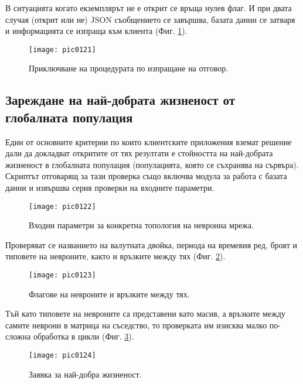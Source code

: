 В ситуацията когато екземплярът не е открит се връща нулев флаг. И при двата случая (открит или не) JSON съобщението се завършва, базата данни се затваря и информацията се изпраща към клиента (Фиг. \ref{fig:pic0121}).

\begin{figure}[h]
  \centering
  \texttt{[image: pic0121]}
  \caption{Приключване на процедурата по изпращане на отговор.}
\label{fig:pic0121}
\end{figure}
\FloatBarrier

\subsection{Зареждане на най-добрата жизненост от глобалната популация}

Един от основните критерии по които клиентските приложения вземат решение дали да докладват откритите от тях резултати е стойността на най-добрата жизненост в глобалната популация (популацията, която се съхранява на сървъра). Скриптът отговарящ за тази проверка също включва модула за работа с базата данни и извършва серия проверки на входните параметри. 

\begin{figure}[h]
  \centering
  \texttt{[image: pic0122]}
  \caption{Входни параметри за конкретна топология на невронна мрежа.}
\label{fig:pic0122}
\end{figure}
\FloatBarrier

Проверяват се названието на валутната двойка, периода на времевия ред, броят и типовете на невроните, както и връзките между тях (Фиг. \ref{fig:pic0122}).

\begin{figure}[h]
  \centering
  \texttt{[image: pic0123]}
  \caption{Флагове на невроните и връзките между тях.}
\label{fig:pic0123}
\end{figure}
\FloatBarrier

Тъй като типовете на невроните са представени като масив, а връзките между самите неврони в матрица на съседство, то проверката им изисква малко по-сложна обработка в цикли (Фиг. \ref{fig:pic0123}).

\begin{figure}[h]
  \centering
  \texttt{[image: pic0124]}
  \caption{Заявка за най-добра жизненост.}
\label{fig:pic0124}
\end{figure}
\FloatBarrier

